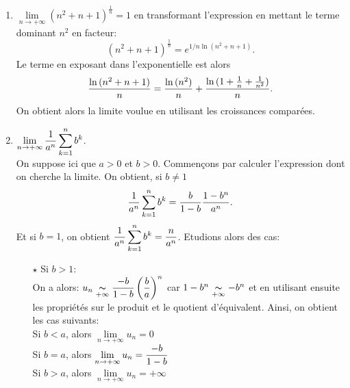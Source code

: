 \documentclass[a4paper, 11pt]{article}
\begin{document}
\begin{correction}
\begin{enumerate}
\item
$\lim \limits_{n\to +\infty}(n^2+n+1)^{\frac{1}{n}}=1$ en transformant l'expression en mettant le terme dominant $n^2$ en facteur:
$$(n^2+n+1)^{\frac{1}{n}}=e^{1/n\ln{(n^2+n+1)}}.$$
Le terme en exposant dans l'exponentielle est alors
$$\displaystyle\frac{\ln{(n^2+n+1)}}{n}=\displaystyle\frac{\ln{(n^2)}}{n}+\displaystyle\frac{\ln{(1+\frac{1}{n}+\frac{1}{n^2})}}{n}.$$
On obtient alors la limite voulue en utilisant les croissances compar\'ees.
\item
$\lim \limits_{n\to +\infty}\displaystyle\frac{1}{a^n}\sum\limits_{k=1}^n b^k$.\\
\noindent On suppose ici que $a>0$ et $b>0$. Commen\c{c}ons par calculer l'expression dont on cherche la limite. On obtient, si $b\not= 1$
$$\displaystyle\frac{1}{a^n}\sum\limits_{k=1}^n b^k=\displaystyle\frac{b}{1-b}\displaystyle\frac{1-b^n}{a^n}.$$
Et si $b=1$, on obtient $\displaystyle\frac{1}{a^n}\sum\limits_{k=1}^n b^k=\displaystyle\frac{n}{a^n}$.
Etudions alors des cas:
\begin{itemize}
\item[$\star$] Si $b>1$:\\
\noindent On a alors: $u_n\underset{+\infty}{\thicksim} \displaystyle\frac{-b}{1-b} \left( \displaystyle\frac{b}{a} \right)^n$ car $1-b^n\underset{+\infty}{\thicksim} -b^n$ et en utilisant ensuite les propri\'et\'es sur le produit et le quotient d'\'equivalent.
Ainsi, on obtient les cas suivants:\\
\noindent Si $b<a$, alors $\lim\limits_{n\to +\infty} u_n=0$\\
\noindent Si $b=a$, alors $\lim\limits_{n\to +\infty} u_n=\displaystyle\frac{-b}{1-b}$\\
\noindent Si $b>a$, alors $\lim\limits_{n\to +\infty} u_n=+\infty$\\

\end{itemize}
\end{enumerate}
\end{correction}
\end{document}
